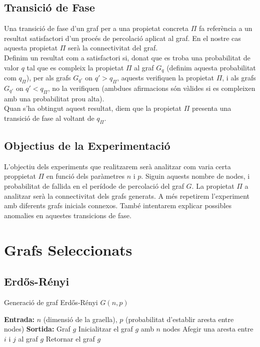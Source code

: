 \documentclass[a4paper]{article}
\begin{document}
	\subsection{Transició de Fase}
	
	Una transició de fase d'un graf per a una propietat concreta $\Pi$ fa referència a un resultat satisfactori d'un procés de percolació aplicat al graf. En el nostre cas aquesta propietat $\Pi$ serà la connectivitat del graf. \\
	
	Definim un resultat com a satisfactori si, donat que es troba una probabilitat de valor $q$ tal que es compleix la propietat $\Pi$ al graf $G_q$ (definim aquesta probabilitat com $q_{\Pi}$), per als grafs $G_{q'}$ on $q' > q_{\Pi}$, aquests verifiquen la propietat $\Pi$, i als grafs $G_{q'}$ on $q' < q_{\Pi}$, no la verifiquen (ambdues afirmacions són vàlides si es compleixen amb una probabilitat prou alta). \\
	
	Quan s'ha obtingut aquest resultat, diem que la propietat $\Pi$ presenta una transició de fase al voltant de $q_{\Pi}$. \\
	
	
	\subsection{Objectius de la Experimentació}
	
	L'objectiu dels experiments que realitzarem serà analitzar com varia certa proppietat $\Pi$ en funció dels paràmetres $n$ i $p$. Siguin aquests nombre de nodes, i probabilitat de fallida en el perídode de percolació del graf $G$. La propietat $\Pi$ a analitzar serà la connectivitat dels grafs generats. A més repetirem l'experiment amb diferents grafs inicials connexos. També intentarem explicar possibles anomalies en aquestes transicions de fase. \\
	
	\newpage
	\section{Grafs Seleccionats}
	
	\subsection{Erdős-Rényi}
	
	\begin{algorithm} [H]
		\caption{Generació de graf Erdős-Rényi $G(n, p)$}
		\begin{algorithmic} [1]
			\Statex \textbf{Entrada:} $n$ (dimensió de la graella), $p$ (probabilitat d'establir aresta entre nodes)
			\Statex \textbf{Sortida:} Graf $g$
			\Statex \vspace{-0.25em}
			\State Inicialitzar el graf $g$ amb $n$ nodes
			\State Afegir una aresta entre $i$ i $j$ al graf $g$
			\EndIf
			\EndFor
			\EndFor
			\State Retornar el graf $g$
		\end{algorithmic}
	\end{algorithm}
	
\end{document}

